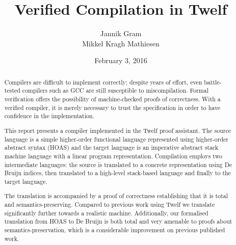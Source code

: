 \title{Verified Compilation in Twelf}
\author{Jannik Gram\\Mikkel Kragh Mathiesen}
\date{February 3, 2016}

\thispagestyle{empty}

\maketitle

\begin{abstract}
Compilers are difficult to implement correctly; despite years of effort, even battle-tested compilers such as GCC are still susceptible to miscompilation.
Formal verification offers the possibility of machine-checked proofs of correctness.
With a verified compiler, it is merely necessary to trust the specification in order to have confidence in the implementation.

This report presents a compiler implemented in the Twelf proof assistant.
The source language is a simple higher-order functional language represented using higher-order abstract syntax (HOAS) and the target language is an imperative abstract stack machine language with a linear program representation.
Compilation employs two intermediate languages: the source is translated to a concrete representation using De Bruijn indices, then translated to a high-level stack-based language and finally to the target language.

The translation is accompanied by a proof of correctness establishing that it is total and semantics-preserving.
Compared to previous work using Twelf we translate significantly further towards a realistic machine.
Additionally, our formalised translation from HOAS to De Bruijn is both total and very amenable to proofs about semantics-preservation, which is a considerable improvement on previous published work.

\end{abstract}

\clearpage

\thispagestyle{empty}

\tableofcontents

\clearpage

